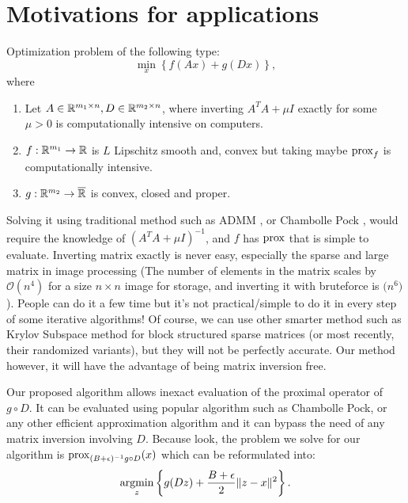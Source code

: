 \documentclass[12pt]{article}
\begin{document}
\section{Motivations for applications}
    Optimization problem of the following type: 
    $$
        \min_{x} \left\lbrace
            f(Ax) + g(Dx)
        \right\rbrace, 
    $$
    where
    \begin{enumerate}[nosep]
        \item Let $A \in \mathbb R^{m_1 \times n}, D \in \mathbb R^{m_2 \times n}$,  where inverting $A^TA + \mu I$ exactly for some $\mu > 0$ is computationally intensive on computers. 
        \item $f: \mathbb R^{m_1} \rightarrow \mathbb R$ is $L$ Lipschitz smooth and, convex but taking maybe $\operatorname{prox}_f$ is computationally intensive. 
        \item $g: \mathbb R^{m_2} \rightarrow \overline {\mathbb R}$ is convex, closed and proper. 
    \end{enumerate}
    Solving it using traditional method such as ADMM \cite[chapter 6]{boyd_distributed_2011}, or Chambolle Pock \cite{chambolle_first-order_2010}, would require the knowledge of $(A^TA + \mu I)^{-1}$, and $f$ has $\operatorname{prox}$ that is simple to evaluate. 
    Inverting matrix exactly is never easy, especially the sparse and large matrix in image processing (The number of elements in the matrix scales by $\mathcal O(n^4)$ for a size $n \times n$ image for storage, and inverting it with bruteforce is $\mathcal (n^{6})$). 
    People can do it a few time but it's not practical/simple to do it in every step of some iterative algorithms! 
    Of course, we can use other smarter method such as Krylov Subspace method for block structured sparse matrices (or most recently, their randomized variants), but they will not be perfectly accurate.
    Our method however, it will have the advantage of being matrix inversion free. 
    \par
    Our proposed algorithm allows inexact evaluation of the proximal operator of $g\circ D$. 
    It can be evaluated using popular algorithm such as Chambolle Pock, or any other efficient approximation algorithm and it can bypass the need of any matrix inversion involving $D$. 
    Because look, the problem we solve for our algorithm is $\operatorname{prox}_{(B + \epsilon)^{-1}g\circ D}(x)$ which can be reformulated into: 
    \begin{align*}
        \mathop{\rm argmin}\limits_{z} \left\lbrace
            g(Dz) + \frac{B + \epsilon}{2}\Vert z - x\Vert^2
        \right\rbrace. 
    \end{align*}
\end{document}
